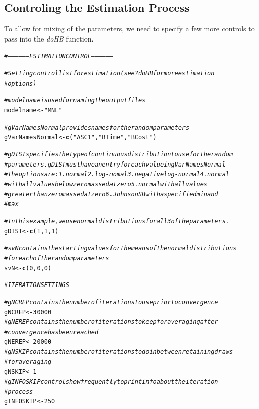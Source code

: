 \documentclass{article}\usepackage[]{graphicx}\usepackage[]{color}
\makeatletter
\newcommand{\hlnum}[1]{\textcolor[rgb]{0.686,0.059,0.569}{#1}}%
\newcommand{\hlstr}[1]{\textcolor[rgb]{0.192,0.494,0.8}{#1}}%
\newcommand{\hlcom}[1]{\textcolor[rgb]{0.678,0.584,0.686}{\textit{#1}}}%
\newcommand{\hlstd}[1]{\textcolor[rgb]{0.345,0.345,0.345}{#1}}%
\newcommand{\hlkwb}[1]{\textcolor[rgb]{0.69,0.353,0.396}{#1}}%
\newcommand{\hlkwd}[1]{\textcolor[rgb]{0.737,0.353,0.396}{\textbf{#1}}}%
\newenvironment{kframe}{%
 \def\at@end@of@kframe{}%
 \ifinner\ifhmode%
  \def\at@end@of@kframe{\end{minipage}}%
  \begin{minipage}{\columnwidth}%
 \fi\fi%
 \def\FrameCommand##1{\hskip\@totalleftmargin \hskip-\fboxsep
 \colorbox{shadecolor}{##1}\hskip-\fboxsep
     \hskip-\linewidth \hskip-\@totalleftmargin \hskip\columnwidth}%
 \MakeFramed {\advance\hsize-\width
   \@totalleftmargin\z@ \linewidth\hsize
   \@setminipage}}%
 {\par\unskip\endMakeFramed%
 \at@end@of@kframe}
\newenvironment{knitrout}{}{} %
\makeatother
\begin{document}
\subsection*{Controling the Estimation Process}

To allow for mixing of the parameters, we need to specify a few more controls to pass into the \emph{doHB} function.

\begin{knitrout}
\color{fgcolor}\begin{kframe}
\begin{alltt}
\hlcom{# ------------------ ESTIMATION CONTROL ------------------}

\hlcom{# Setting control list for estimation (see ?doHB for more estimation}
\hlcom{# options)}

\hlcom{# modelname is used for naming the output files}
\hlstd{modelname} \hlkwb{<-} \hlstr{"MNL"}

\hlcom{# gVarNamesNormal provides names for the random parameters}
\hlstd{gVarNamesNormal} \hlkwb{<-} \hlkwd{c}\hlstd{(}\hlstr{"ASC1"}\hlstd{,} \hlstr{"BTime"}\hlstd{,} \hlstr{"BCost"}\hlstd{)}

\hlcom{# gDIST specifies the type of continuous distribution to use for the random}
\hlcom{# parameters.  gDIST must have an entry for each value in gVarNamesNormal}
\hlcom{# The options are: 1. normal 2. log-nomal 3. negative log-normal 4. normal}
\hlcom{# with all values below zero massed at zero 5. normal with all values}
\hlcom{# greater than zero massed at zero 6. Johnson SB with a specified min and}
\hlcom{# max}

\hlcom{# In this example, we use normal distributions for all 3 of the parameters.}
\hlstd{gDIST} \hlkwb{<-} \hlkwd{c}\hlstd{(}\hlnum{1}\hlstd{,} \hlnum{1}\hlstd{,} \hlnum{1}\hlstd{)}

\hlcom{# svN contains the starting values for the means of the normal distributions}
\hlcom{# for each of the random parameters}
\hlstd{svN} \hlkwb{<-} \hlkwd{c}\hlstd{(}\hlnum{0}\hlstd{,} \hlnum{0}\hlstd{,} \hlnum{0}\hlstd{)}

\hlcom{# ITERATION SETTINGS}

\hlcom{# gNCREP contains the number of iterations to use prior to convergence}
\hlstd{gNCREP} \hlkwb{<-} \hlnum{30000}
\hlcom{# gNEREP contains the number of iterations to keep for averaging after}
\hlcom{# convergence has been reached}
\hlstd{gNEREP} \hlkwb{<-} \hlnum{20000}
\hlcom{# gNSKIP contains the number of iterations to do in between retaining draws}
\hlcom{# for averaging}
\hlstd{gNSKIP} \hlkwb{<-} \hlnum{1}
\hlcom{# gINFOSKIP controls how frequently to print info about the iteration}
\hlcom{# process}
\hlstd{gINFOSKIP} \hlkwb{<-} \hlnum{250}


\end{alltt}
\end{kframe}
\end{knitrout}
\end{document}
